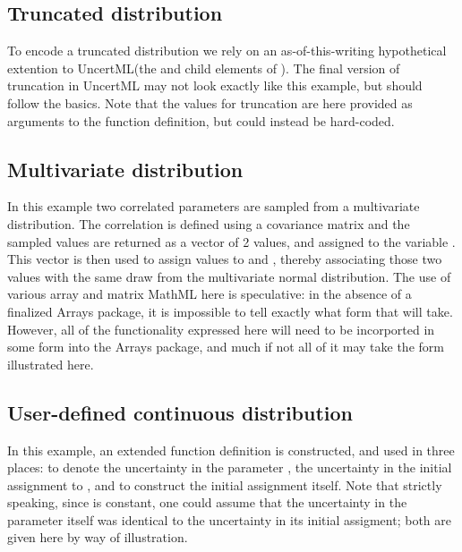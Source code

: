 \documentclass[draftspec]{sbmlpkgspec}
\newcommand{\mathml}{MathML\xspace}
\newcommand{\uncertml}{UncertML\xspace}
\begin{document}

\subsection{Truncated distribution}
\label{sec: truncated-eg}

To encode a truncated distribution we rely on an as-of-this-writing hypothetical extention to \uncertml (the  and  child elements of ).  The final version of truncation in \uncertml may not look exactly like this example, but should follow the basics.  Note that the values for truncation are here provided as arguments to the function definition, but could instead be hard-coded.


\subsection{Multivariate distribution}

In this example two correlated parameters are sampled from a
multivariate distribution. The correlation is defined using a
covariance matrix and the sampled values are returned as a vector of 2
values, and assigned to the variable .  This vector is then used to assign values to  and , thereby associating those two values with the same draw from the multivariate normal distribution.  The use of various array and matrix \mathml here is speculative:  in the absence of a finalized Arrays package, it is impossible to tell exactly what form that will take.  However, all of the functionality expressed here will need to be incorported in some form into the Arrays package, and much if not all of it may take the form illustrated here.


\subsection{User-defined continuous distribution }

In this example, an extended function definition is constructed, and used in three places:  to denote the uncertainty in the parameter , the uncertainty in the initial assignment to , and to construct the initial assignment itself.  Note that strictly speaking, since  is constant, one could assume that the uncertainty in the parameter itself was identical to the uncertainty in its initial assigment; both are given here by way of illustration.
\end{document}
